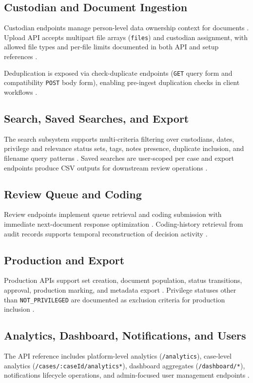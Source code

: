 \documentclass[conference]{IEEEtran}
\begin{document}
\subsection{Custodian and Document Ingestion}
Custodian endpoints manage person-level data ownership context for documents \cite{api}. Upload API accepts multipart file arrays (\texttt{files}) and custodian assignment, with allowed file types and per-file limits documented in both API and setup references \cite{api,setup}.

Deduplication is exposed via check-duplicate endpoints (\texttt{GET} query form and compatibility \texttt{POST} body form), enabling pre-ingest duplication checks in client workflows \cite{api}.

\subsection{Search, Saved Searches, and Export}
The search subsystem supports multi-criteria filtering over custodians, dates, privilege and relevance status sets, tags, notes presence, duplicate inclusion, and filename query patterns \cite{api}. Saved searches are user-scoped per case and export endpoints produce CSV outputs for downstream review operations \cite{api}.

\subsection{Review Queue and Coding}
Review endpoints implement queue retrieval and coding submission with immediate next-document response optimization \cite{api}. Coding-history retrieval from audit records supports temporal reconstruction of decision activity \cite{api,roles}.

\subsection{Production and Export}
Production APIs support set creation, document population, status transitions, approval, production marking, and metadata export \cite{api}. Privilege statuses other than \texttt{NOT\_PRIVILEGED} are documented as exclusion criteria for production inclusion \cite{roles}.

\subsection{Analytics, Dashboard, Notifications, and Users}
The API reference includes platform-level analytics (\texttt{/analytics}), case-level analytics (\texttt{/cases/:caseId/analytics*}), dashboard aggregates (\texttt{/dashboard/*}), notifications lifecycle operations, and admin-focused user management endpoints \cite{api}.
\end{document}
